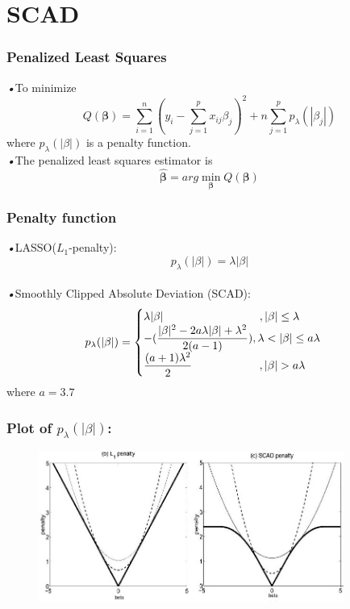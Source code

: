 \documentclass{beamer}
\begin{document}
\section{SCAD}     
    \begin{frame}
      \frametitle{Penalized Least Squares}
      \emph{•}To minimize
      \begin{equation}
         Q(\boldsymbol{\beta})=\sum_{i=1}^{n}(y_i-\sum_{j=1}^px_{ij}\beta_j )^2 + n\sum_{j=1}^p p_{\lambda}(|\beta_j|)
      \end{equation}
      where $p_{\lambda}(|\beta|)$ is a penalty function.
      \\\emph{•}The penalized least squares estimator is
      \begin{equation*}
         \hat{\boldsymbol{\beta}} = arg \min\limits_{\boldsymbol{\beta}} Q(\boldsymbol{\beta}) 
      \end{equation*}
    \end{frame}
    
    \begin{frame}
      \frametitle{Penalty function}
      \emph{•}LASSO($L_1$-penalty):
      \begin{equation*}
          p_{\lambda}(|\beta|)=\lambda|\beta|
      \end{equation*}
      \\\emph{•}Smoothly Clipped Absolute Deviation (SCAD):
      \begin{equation*}
           p_{\lambda}(|\beta|)=\begin{cases} \lambda|\beta| \hspace{3cm},|\beta|\leq\lambda \\
                                       -(\dfrac{|\beta|^2-2a\lambda|\beta|+\lambda^2}{2(a-1)}) ,\lambda<|\beta|\leq a\lambda \\
                                \dfrac{(a+1)\lambda^2}{2} \hspace{2.1cm},|\beta|>a\lambda          \end{cases}    
      \end{equation*} 
      \quad where $a=3.7$ 
    \end{frame}
    
    \begin{frame}
     \frametitle{Plot of $p_{\lambda}(|\beta|)$:}
      \begin{figure}[h]
      \begin{center}
      \includegraphics[width=10cm]{image01}
      \end{center}
      \end{figure}
    \end{frame}
    
\end{document}
